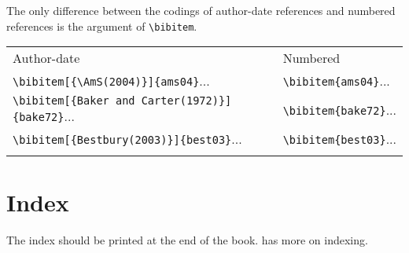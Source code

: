 The only difference between the codings of author-date references
and numbered references is the argument of \verb|\bibitem|.

\begin{center}\tablefont
\begin{tabular}{@{}ll@{}}\toprule
Author-date & Numbered\\\colrule
\verb|\bibitem[{\AmS(2004)}]{ams04}|... &\verb|\bibitem{ams04}|...\\
\verb|\bibitem[{Baker and Carter(1972)}]{bake72}|... &\verb|\bibitem{bake72}|...\\
\verb|\bibitem[{Bestbury(2003)}]{best03}|... &\verb|\bibitem{best03}|...\\
\botrule
\end{tabular}
\end{center}

\section{Index}
The index should be printed at the end of the book.  has more
on indexing.

